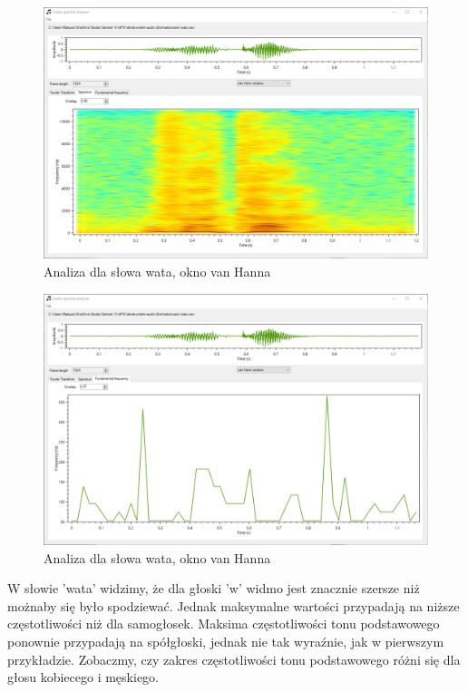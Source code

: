 \documentclass{article}
\begin{document}
\begin{figure}[H]
\includegraphics[width=6in]{scr14.png}
\centering
\caption{Analiza dla słowa wata, okno van Hanna}
\end{figure}

\begin{figure}[H]
\includegraphics[width=6in]{scr15.png}
\centering
\caption{Analiza dla słowa wata, okno van Hanna}
\end{figure}

W słowie 'wata' widzimy, że dla głoski 'w' widmo jest znacznie szersze niż możnaby się było spodziewać. Jednak maksymalne wartości przypadają na niższe częstotliwości niż dla samogłosek. Maksima częstotliwości tonu podstawowego ponownie przypadają na spółgłoski, jednak nie tak wyraźnie, jak w pierwszym przykładzie. Zobaczmy, czy zakres częstotliwości tonu podstawowego różni się dla głosu kobiecego i męskiego.
\end{document}
